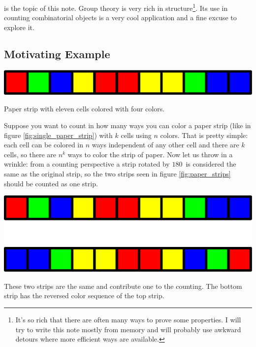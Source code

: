  is the topic of this note. Group theory is very rich in structure\footnote{It's so rich that there are often many ways to prove some properties. I will try to write this note mostly from memory and will probably use awkward detours where more efficient ways are available.}. Its use in counting combinatorial objects is a very cool application and a fine excuse to explore it.

\subsection{Motivating Example}

\begin{marginfigure}[0.5in]
\includegraphics[scale=0.3]{single_paper_strip.pdf}
\caption{Paper strip with eleven cells colored with four colors.}
\label{fig:single_paper_strip}
\end{marginfigure}

Suppose you want to count in how many ways you can color a paper strip (like in figure \ref{fig:single_paper_strip}) with $k$ cells using $n$ colors. That is pretty simple: each cell can be colored in $n$ ways independent of any other cell and there are $k$ cells, so there are $n^k$ ways to color the strip of paper. Now let us throw in a wrinkle: from a counting perspective a strip rotated by $180$\textdegree\ is considered the same as the original strip, so the two strips seen in figure \ref{fig:paper_strips} should be counted as one strip.

\begin{marginfigure}[0.5in]
\includegraphics[scale=0.3]{paper_strips.pdf}
\caption{These two strips are the same and contribute one to the counting. The bottom strip has the reversed color sequence of the top strip.}
\label{fig:paper_strips}
\end{marginfigure}

